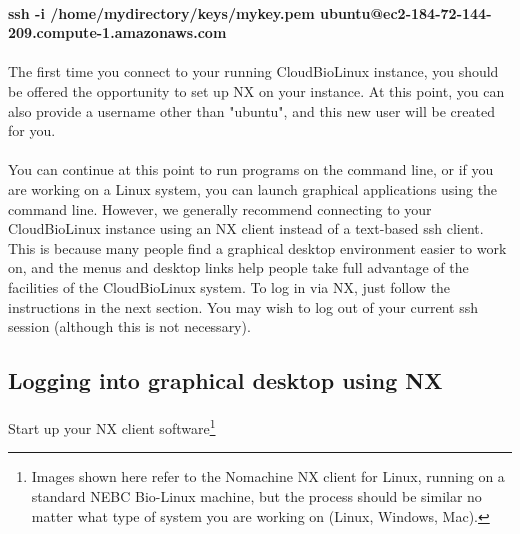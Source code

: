 \paragraph{ssh -i /home/mydirectory/keys/mykey.pem ubuntu@ec2-184-72-144-209.compute-1.amazonaws.com} 

\paragraph{}The first time you connect to your running CloudBioLinux instance, you should be offered the opportunity to set up NX on your instance. At this point, you can also provide a username other than "ubuntu", and this new user will be created for you. 

\paragraph{}You can continue at this point to run programs on the command line, or if you are working on a Linux system, you can launch graphical applications using the command line. However, we generally recommend connecting to your CloudBioLinux instance using an NX client instead of a text-based ssh client. This is because many people find a graphical desktop environment easier to work on, and the menus and desktop links help people take full advantage of the facilities of the CloudBioLinux system. To log in via NX, just follow the instructions in the next section. You may wish to log out of your current ssh session (although this is not necessary).

\label{section:nx}
\subsection{Logging into graphical desktop using NX}

\paragraph{}Start up your NX client software\footnote{Images shown here refer to the Nomachine NX client for Linux, running on a standard NEBC Bio-Linux machine, but the process should be similar no matter what type of system you are working on (Linux, Windows, Mac).}

